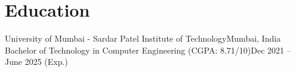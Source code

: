 \section{Education}
  \resumeSubHeadingListStart
    \resumeSubheading
      {University of Mumbai - Sardar Patel Institute of Technology}{Mumbai, India}
      {Bachelor of Technology in Computer Engineering (CGPA: 8.71/10)}{Dec 2021 -- June 2025 (Exp.)}{}
  \resumeSubHeadingListEnd